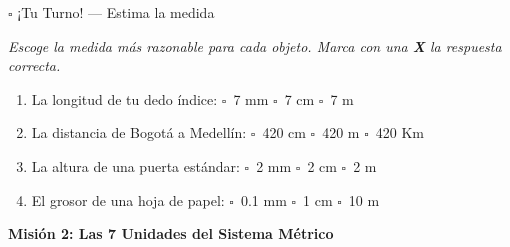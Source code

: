 \documentclass[12pt, letterpaper]{article}
\newcommand{\mision}[2]{%
  \needspace{4cm}%
  \vspace{5pt}%
  \begin{tcolorbox}[
    enhanced,
    colback  = #1,
    colframe = #1!60!black,
    arc=3mm, boxrule=1.5pt,
    left=6pt, right=6pt, top=5pt, bottom=5pt,
  ]
    {\large\bfseries\color{white} #2}
  \end{tcolorbox}%
  \vspace{2pt}%
}
\begin{document}
\begin{practica}{$\square$ {¡}Tu Turno! --- Estima la medida}

\textit{Escoge la medida más razonable para cada objeto.
Marca con una \textbf{X} la respuesta correcta.}

\vspace{6pt}
\begin{enumerate}[itemsep=0.7cm, label=\textbf{\arabic*.}]
  \item La longitud de tu dedo índice:
        \hspace{0.4cm}$\square$\ 7 mm
        \hspace{0.8cm}$\square$\ 7 cm
        \hspace{0.8cm}$\square$\ 7 m

  \item La distancia de Bogotá a Medellín:
        \hspace{0.4cm}$\square$\ 420 cm
        \hspace{0.8cm}$\square$\ 420 m
        \hspace{0.8cm}$\square$\ 420 Km

  \item La altura de una puerta estándar:
        \hspace{0.4cm}$\square$\ 2 mm
        \hspace{0.8cm}$\square$\ 2 cm
        \hspace{0.8cm}$\square$\ 2 m

  \item El grosor de una hoja de papel:
        \hspace{0.4cm}$\square$\ 0.1 mm
        \hspace{0.8cm}$\square$\ 1 cm
        \hspace{0.8cm}$\square$\ 10 m
\end{enumerate}
\end{practica}


\mision{valblue}{Misión 2: Las 7 Unidades del Sistema Métrico}
\end{document}
